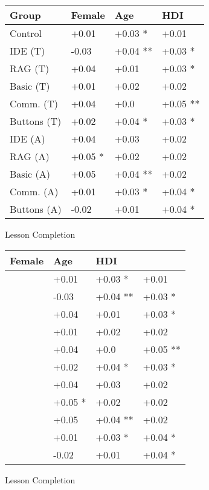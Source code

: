 \centering
\begin{tabular}{llll}
\toprule
Group & Female & Age & HDI \\ \midrule
Control  & +0.01 & +0.03 * & +0.01\\
IDE (T)  & -0.03 & +0.04 ** & +0.03 *\\
RAG (T)  & +0.04 & +0.01 & +0.03 *\\
Basic (T)  & +0.01 & +0.02 & +0.02\\
Comm. (T)  & +0.04 & +0.0 & +0.05 **\\
Buttons (T)  & +0.02 & +0.04 * & +0.03 *\\
IDE (A)  & +0.04 & +0.03 & +0.02\\
RAG (A)  & +0.05 * & +0.02 & +0.02\\
Basic (A)  & +0.05 & +0.04 ** & +0.02\\
Comm. (A)  & +0.01 & +0.03 * & +0.04 *\\
Buttons (A)  & -0.02 & +0.01 & +0.04 *\\
\bottomrule
\end{tabular}
\caption{Lesson Completion}
\label{tab:demo_table}
\centering
\begin{tabular}{lll}
\toprule
Female & Age & HDI \\ \midrule
 & +0.01 & +0.03 * & +0.01\\
 & -0.03 & +0.04 ** & +0.03 *\\
 & +0.04 & +0.01 & +0.03 *\\
 & +0.01 & +0.02 & +0.02\\
 & +0.04 & +0.0 & +0.05 **\\
 & +0.02 & +0.04 * & +0.03 *\\
 & +0.04 & +0.03 & +0.02\\
 & +0.05 * & +0.02 & +0.02\\
 & +0.05 & +0.04 ** & +0.02\\
 & +0.01 & +0.03 * & +0.04 *\\
 & -0.02 & +0.01 & +0.04 *\\
\bottomrule
\end{tabular}
\caption{Lesson Completion}
\label{tab:demo_table}
